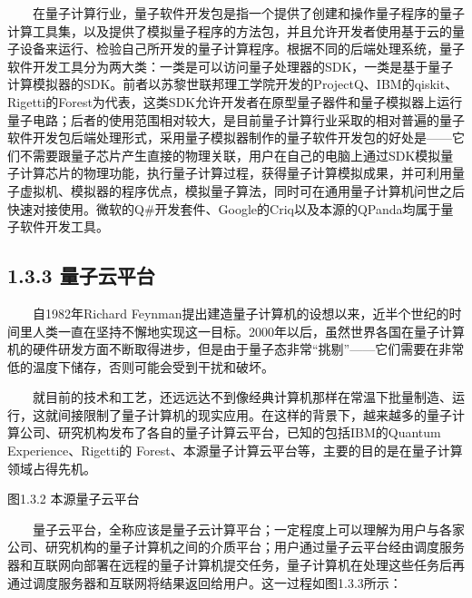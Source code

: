 \documentclass[a4paper,11pt,english]{sphinxmanual}
\begin{document}
\sphinxAtStartPar
  在量子计算行业，量子软件开发包是指一个提供了创建和操作量子程序的量子计算工具集，以及提供了模拟量子程序的方法包，并且允许开发者使用基于云的量子设备来运行、检验自己所开发的量子计算程序。根据不同的后端处理系统，量子软件开发工具分为两大类：一类是可以访问量子处理器的SDK，一类是基于量子计算模拟器的SDK。前者以苏黎世联邦理工学院开发的ProjectQ、IBM的qiskit、Rigetti的Forest为代表，这类SDK允许开发者在原型量子器件和量子模拟器上运行量子电路；后者的使用范围相对较大，是目前量子计算行业采取的相对普遍的量子软件开发包后端处理形式，采用量子模拟器制作的量子软件开发包的好处是——它们不需要跟量子芯片产生直接的物理关联，用户在自己的电脑上通过SDK模拟量子计算芯片的物理功能，执行量子计算过程，获得量子计算模拟成果，并可利用量子虚拟机、模拟器的程序优点，模拟量子算法，同时可在通用量子计算机问世之后快速对接使用。微软的Q\#开发套件、Google的Criq以及本源的QPanda均属于量子软件开发工具。


\subsection{1.3.3 量子云平台}
\label{\detokenize{rst/1.3_u91cf_u5b50_u8ba1_u7b97_u8f6f_u4ef6_u4ecb_u7ecd:id4}}
\sphinxAtStartPar
  自1982年Richard Feynman提出建造量子计算机的设想以来，近半个世纪的时间里人类一直在坚持不懈地实现这一目标。2000年以后，虽然世界各国在量子计算机的硬件研发方面不断取得进步，但是由于量子态非常“挑剔”——它们需要在非常低的温度下储存，否则可能会受到干扰和破坏。

\sphinxAtStartPar
  就目前的技术和工艺，还远远达不到像经典计算机那样在常温下批量制造、运行，这就间接限制了量子计算机的现实应用。在这样的背景下，越来越多的量子计算公司、研究机构发布了各自的量子计算云平台，已知的包括IBM的Quantum Experience、Rigetti的 Forest、本源量子计算云平台等，主要的目的是在量子计算领域占得先机。


\begin{center}图1.3.2 本源量子云平台
\end{center}
\sphinxAtStartPar
  量子云平台，全称应该是量子云计算平台；一定程度上可以理解为用户与各家公司、研究机构的量子计算机之间的介质平台；用户通过量子云平台经由调度服务器和互联网向部署在远程的量子计算机提交任务，量子计算机在处理这些任务后再通过调度服务器和互联网将结果返回给用户。这一过程如图1.3.3所示：

\end{document}
